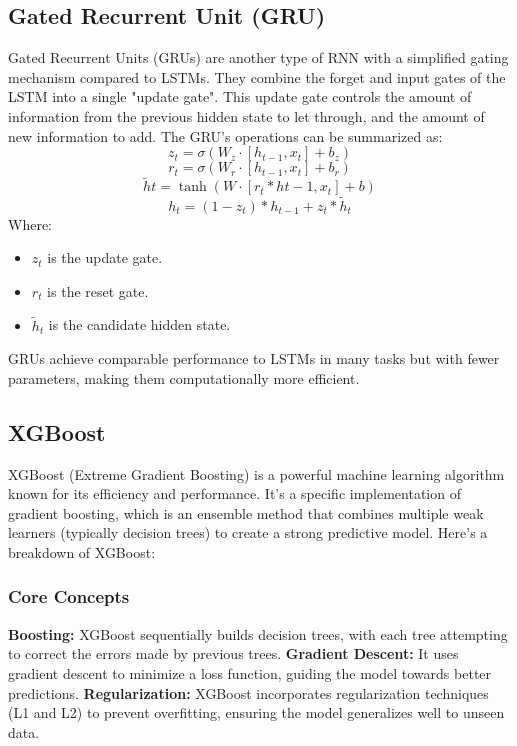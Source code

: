 \documentclass{ieeeojies}
\begin{document}
\subsection{Gated Recurrent Unit (GRU)}
Gated Recurrent Units (GRUs) are another type of RNN with a simplified gating mechanism compared to LSTMs. They combine the forget and input gates of the LSTM into a single "update gate". This update gate controls the amount of information from the previous hidden state to let through, and the amount of new information to add.
The GRU's operations can be summarized as:
\begin{dmath*}
    z_t = \sigma(W_z \cdot [h_{t-1}, x_t] + b_z)
\end{dmath*}
\begin{dmath*}
    r_t = \sigma(W_r \cdot [h_{t-1}, x_t] + b_r)
\end{dmath*}
\begin{dmath*}
    \tilde{h}t = \tanh(W \cdot [r_t * h{t-1}, x_t] + b)
\end{dmath*}
\begin{dmath*}
    h_t = (1 - z_t) * h_{t-1} + z_t * \tilde{h}_t
\end{dmath*}
Where:
\begin{itemize}
    \item \(z_t\) is the update gate.
    \item \(r_t\) is the reset gate.
    \item \(\tilde{h}_t\) is the candidate hidden state.
\end{itemize}
GRUs achieve comparable performance to LSTMs in many tasks but with fewer parameters, making them computationally more efficient.

\subsection{XGBoost}
XGBoost (Extreme Gradient Boosting) is a powerful machine learning algorithm known for its efficiency and performance. It's a specific implementation of gradient boosting, which is an ensemble method that combines multiple weak learners (typically decision trees) to create a strong predictive model.
Here's a breakdown of XGBoost:
\subsubsection{Core Concepts}
\textbf{Boosting:} XGBoost sequentially builds decision trees, with each tree attempting to correct the errors made by previous trees.
\textbf{Gradient Descent:} It uses gradient descent to minimize a loss function, guiding the model towards better predictions.
\textbf{Regularization:} XGBoost incorporates regularization techniques (L1 and L2) to prevent overfitting, ensuring the model generalizes well to unseen data.
\end{document}
